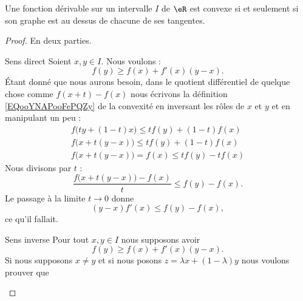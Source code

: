 \begin{proposition} \label{PROPooQPOSooDZlUAJ}
    Une fonction dérivable sur un intervalle \( I\) de \( \eR\) est convexe si et seulement si son graphe est au dessus de chacune de ses tangentes.
\end{proposition}

\begin{proof}
    En deux parties.
    \begin{subproof}
        \item[Sens direct]
            Soient \( x,y\in I\). Nous voulons :
            \begin{equation}
                f(y)\geq f(x)+f'(x)(y-x).
            \end{equation}
            Étant donné que nous aurons besoin, dans le quotient différentiel de quelque chose comme \( f(x+t)-f(x)\) nous écrivons la définition \eqref{EQooYNAPooFePQZy} de la convexité en inversant les rôles de \( x\) et \( y\) et en manipulant un peu :
            \begin{subequations}
                \begin{align}
                    f\big( ty+(1-t)x \big)\leq tf(y)+(1-t)f(x)\\
                    f\big( x+t(y-x) \big)\leq tf(y)+(1-t)f(x)\\
                    f\big(  x+t(y-x)  \big)=f(x)\leq tf(y)-tf(x)
                \end{align}
            \end{subequations}
            Nous divisons par \( t\) :
            \begin{equation}
                \frac{ f\big( x+t(y-x) \big)-f(x) }{ t }\leq f(y)-f(x).
            \end{equation}
            Le passage à la limite \( t\to 0\) donne
            \begin{equation}
                (y-x)f'(x)\leq f(y)-f(x),
            \end{equation}
            ce qu'il fallait.
        \item[Sens inverse]
            Pour tout \( x,y\in I\) nous supposons avoir
            \begin{equation}        \label{EQooEXXIooHXJnER}
                f(y)\geq f(x)+f'(x)(y-x).
            \end{equation}
            Si nous supposons \( x\neq y\) et si nous posons \( z=\lambda x+(1-\lambda)y\) nous voulons prouver que
            \begin{equation}

\end{equation}
\end{subproof}
\end{proof}

